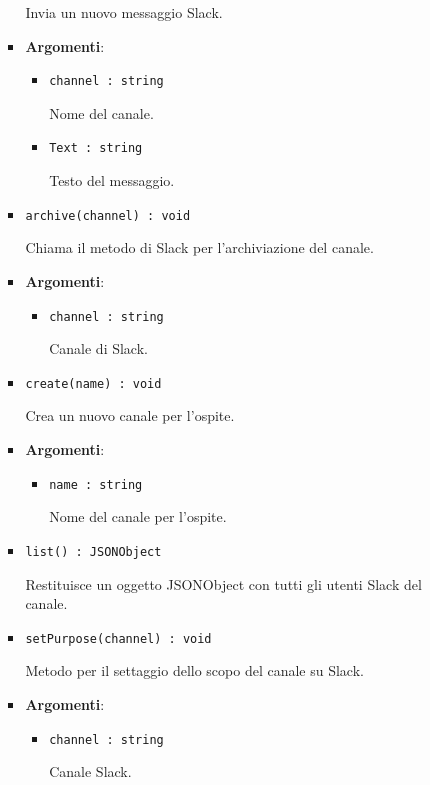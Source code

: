 \documentclass[../DefinizioneDiProdotto.tex]{subfiles}
\begin{document}
\begin{itemize}
\begin{itemize}
\begin{itemize}
	 Invia un nuovo messaggio Slack.

	\item \textbf{Argomenti}:
	\begin{itemize}
	\item \texttt{channel : string}\

	 Nome del canale.
	\item \texttt{Text : string}\

	 Testo del messaggio.
	\end{itemize}
	\end{itemize}\vspace{0.5em}
	\begin{itemize}
	\item \texttt{archive(channel) : void}\

	 Chiama il metodo di Slack per l'archiviazione del canale.

	\item \textbf{Argomenti}:
	\begin{itemize}
	\item \texttt{channel : string}\

	 Canale di Slack.
	\end{itemize}
	\end{itemize}\vspace{0.5em}
	\begin{itemize}
	\item \texttt{create(name) : void}\

	 Crea un nuovo canale per l'ospite.

	\item \textbf{Argomenti}:
	\begin{itemize}
	\item \texttt{name : string}\

	 Nome del canale per l'ospite.
	\end{itemize}
	\end{itemize}\vspace{0.5em}
	\begin{itemize}
	\item \texttt{list() : JSONObject}\

	 Restituisce un oggetto JSONObject con tutti gli utenti Slack del canale.
	\end{itemize}\vspace{0.5em}
	\begin{itemize}
	\item \texttt{setPurpose(channel) : void}\

	 Metodo per il settaggio dello scopo del canale su Slack.

	\item \textbf{Argomenti}:
	\begin{itemize}
	\item \texttt{channel : string}\

	 Canale Slack.
	\end{itemize}
	\end{itemize}\vspace{0.5em}
	\end{itemize}\end{itemize}
\end{document}
